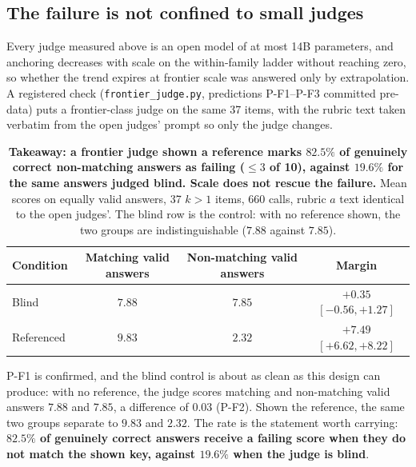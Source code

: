\documentclass[11pt]{article}
\begin{document}
\FloatBarrier
\subsection{The failure is not confined to small judges}
\label{sec:frontier}

Every judge measured above is an open model of at most 14B parameters, and anchoring decreases with scale on the within-family ladder without reaching zero, so whether the trend expires at frontier scale was answered only by extrapolation.
A registered check (\texttt{frontier\_judge.py}, predictions P-F1--P-F3 committed pre-data) puts a frontier-class judge on the same 37 items, with the rubric text taken verbatim from the open judges' prompt so only the judge changes.

\begin{table}[tbp]
\centering
\small
\setlength{\tabcolsep}{6pt}
\begin{tabular}{lccc}
\toprule
Condition & Matching valid answers & Non-matching valid answers & Margin \\
\midrule
Blind & $7.88$ & $7.85$ & $+0.35$ {\scriptsize$[-0.56, +1.27]$} \\
Referenced & $9.83$ & $\mathbf{2.32}$ & $\mathbf{+7.49}$ {\scriptsize$[+6.62, +8.22]$} \\
\bottomrule
\end{tabular}
\caption{\textbf{Takeaway: a frontier judge shown a reference marks $82.5\%$ of genuinely correct non-matching answers as failing ($\leq 3$ of 10), against $19.6\%$ for the same answers judged blind. Scale does not rescue the failure.}
Mean scores on equally valid answers, 37 $k{>}1$ items, 660 calls, rubric $a$ text identical to the open judges'. The blind row is the control: with no reference shown, the two groups are indistinguishable ($7.88$ against $7.85$).}
\label{tab:frontier}
\end{table}

P-F1 is confirmed, and the blind control is about as clean as this design can produce: with no reference, the judge scores matching and non-matching valid answers $7.88$ and $7.85$, a difference of $0.03$ (P-F2).
Shown the reference, the same two groups separate to $9.83$ and $2.32$.
The rate is the statement worth carrying: \textbf{$82.5\%$ of genuinely correct answers receive a failing score when they do not match the shown key, against $19.6\%$ when the judge is blind}.
\end{document}
